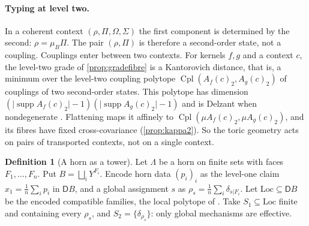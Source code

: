 \documentclass[11pt]{article}
\theoremstyle{definition}
\newtheorem{definition}[theorem]{Definition}
\theoremstyle{remark}
\newcommand{\D}{\mathsf{D}}
\newcommand{\Cpl}{\operatorname{Cpl}}
\newcommand{\supp}{\operatorname{supp}}
\begin{document}
\paragraph{Typing at level two.} In a coherent context $(\rho,\Pi,\Omega,\Sigma)$ the first component is determined by the second:
$\rho=\mu_B\Pi$. The pair $(\rho,\Pi)$ is therefore a second-order state, not a coupling. Couplings enter between two
contexts. For kernels $f,g$ and a context $c$, the level-two grade of \cref{prop:gradefibre} is a Kantorovich distance, that is,
a minimum over the level-two coupling polytope $\Cpl(A_f(c)_2,A_g(c)_2)$ of couplings of two second-order states. This polytope
has dimension $(\lvert\supp A_f(c)_2\rvert-1)(\lvert\supp A_g(c)_2\rvert-1)$ and is Delzant when nondegenerate
\cite[Prop.~5.1]{Awasthi-Family}. Flattening maps it affinely to $\Cpl(\mu A_f(c)_2,\mu A_g(c)_2)$, and its fibres have fixed
cross-covariance (\cref{prop:kappa2}). So the toric geometry acts on pairs of transported contexts, not on a single context.

\begin{definition}[A horn as a tower]\label{def:horntower}
Let $\Lambda$ be a horn on finite sets with faces $F_1,\dots,F_n$. Put $B=\bigsqcup_iY^{F_i}$. Encode horn data
$(p_i)_i$ as the level-one claim $x_1=\frac1n\sum_i p_i$ in $\D B$, and a global assignment $s$ as $\rho_s=\frac1n\sum_i\delta_{s|F_i}$.
Let $\mathrm{Loc}\subseteq\D B$ be the encoded compatible families, the local polytope of \cite{AbramskyBrandenburger2011}. Take
$S_1\subseteq\mathrm{Loc}$ finite and containing every $\rho_s$, and $S_2=\{\delta_{\rho_s}\}$: only global mechanisms are effective.
\end{definition}
\end{document}
